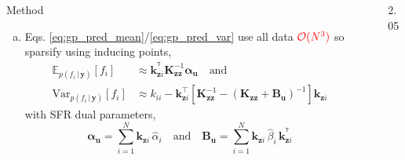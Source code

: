 \documentclass[final,12pt]{beamer}
\newlength{\sepwidth}
\newlength{\colwidth}
\newcommand{\separatorcolumn}{\begin{column}{\sepwidth}\end{column}}
\newcommand{\mathbold}[1]{\bm{#1}}
\newcommand{\mbf}[1]{\mathbf{#1}}
\newcommand{\T}{^\mathsf{T}}
\newcommand{\valpha}[0]{\mathbold{\alpha}}
\renewcommand{\mid}{\,|\,}
\newcommand{\vu}{\mbf{u}}
\newcommand{\vw}{\mbf{w}}
\newcommand{\vy}{\mbf{y}}
\newcommand{\vz}{\mbf{z}}
\newcommand{\MKzz}{\mbf{K}_{\mbf{z}\mbf{z}}}
\newcommand{\vkzi}{\mbf{k}_{\mbf{z}i}}
\newcommand{\vkzs}{\mbf{k}_{\mbf{z}i}}
\newcommand{\MBeta}[0]{\mathbold{B}}
\newcommand{\R}{\mathbb{R}}
\newcommand{\myexpect}{\mathbb{E}}
\begin{document}
\begin{frame}[t]
\begin{columns}[t]
\begin{column}{\colwidth}
\begin{block}{Method}
  \begin{enumerate}[(a)]
    \item Eqs. \ref{eq:gp_pred_mean}/\ref{eq:gp_pred_var} use all data $\color{red}{\mathcal{O}(N^3)}$ so sparsify using inducing points, %
            \begin{align}
            \myexpect_{p(f_i \mid\vy)}[f_i] &\approx   \vkzs^{\T} \MKzz^{-1} \valpha_{\vu}
            \quad \text{and} \\
            \mathrm{Var}_{p(f_i \mid \vy)}[f_i] &\approx  k_{ii} - \vkzs^\top [\MKzz^{-1} - (\MKzz + \MBeta_{\vu})^{-1} ]\vkzs
            \end{align}
            with \alert{SFR dual parameters}, %
            \begin{equation}
            \valpha_{\vu}  =  \sum_{i=1}^N  \vkzi \, \hat{\alpha}_{i} %
            \quad \text{and} \quad
            \MBeta_{\vu} =  \sum_{i=1}^N \vkzi \,\hat{\beta}_{i} \, \vkzi^{\T} %
            \end{equation}
    \end{enumerate}

  \end{block}

\end{column}

\separatorcolumn

\begin{column}{2.05\colwidth}

\begin{minipage}{\textwidth}





\end{minipage}
\end{column}
\end{columns}
\end{frame}
\end{document}
